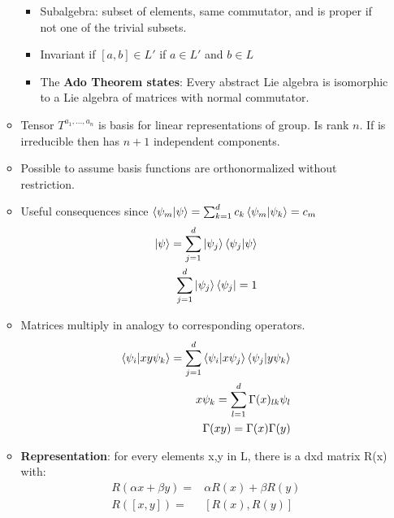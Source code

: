 \begin{itemize}
\begin{itemize}
\begin{itemize}
        \item Subalgebra: subset of elements, same commutator, and is proper if not one of the trivial subsets. \cite{pfeifer}
        \item Invariant if $[a,b]\in L'$ if $a\in L'$ and $b\in L$  \cite{pfeifer}
    \item The \textbf{Ado Theorem states}: Every abstract Lie algebra is isomorphic to a Lie algebra of matrices with normal commutator. \cite{pfeifer}
    \end{itemize}
    \item Tensor $T^{a_1,...,a_n}$ is basis for linear representations of group. Is rank $n$. If is irreducible then has $n+1$ independent components. \cite{hokim}
    \item Possible to assume basis functions are orthonormalized without restriction. \cite{pfeifer}
    \item Useful consequences since $\braket{\psi_m|\psi}=\sum_{k=1}^d c_k\braket{\psi_m|\psi_k}=c_m$ \cite{pfeifer}
    \begin{equation}\begin{split}
    \ket{\psi}=\sum_{j=1}^d\ket{\psi_j}\braket{\psi_j|\psi}\\
    \sum_{j=1}^d\ket{\psi_j}\bra{\psi_j}=1 \\
    \end{split}\end{equation}
    \item Matrices multiply in analogy to corresponding operators. \cite{pfeifer}
    \begin{equation}\begin{split}
    \braket{\psi_i|xy\psi_k}=\sum_{j=1}^d\braket{\psi_i|x\psi_j}\braket{\psi_j|y\psi_k} \\
    x\psi_k=\sum_{l=1}^d\Gamma(x)_{lk}\psi_l \\
    \Gamma(xy)=\Gamma(x)\Gamma(y) \\
    \end{split}\end{equation}
    \item \textbf{Representation}: for every elements x,y in L, there is a dxd matrix R(x) with: \cite{pfeifer}
    \begin{equation}\begin{split}
    R(\alpha x+\beta y)=&\alpha R(x)+\beta R(y) \\
    R([x,y])=&[R(x),R(y)] \\
    \end{split}\end{equation}

\end{itemize}
\end{itemize}
